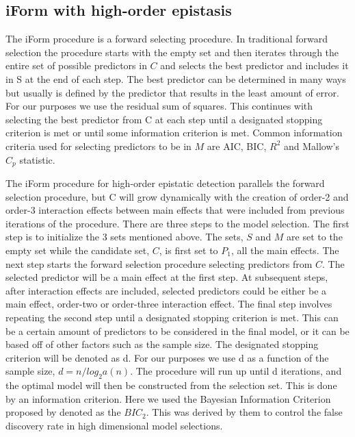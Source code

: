 \documentclass[11pt,]{book}
\theoremstyle{definition}
\theoremstyle{definition}
\theoremstyle{remark}
\begin{document}
\subsection{iForm with high-order
epistasis}\label{iform-with-high-order-epistasis}

The iForm procedure is a forward selecting procedure. In traditional
forward selection the procedure starts with the empty set and then
iterates through the entire set of possible predictors in \(C\) and
selects the best predictor and includes it in S at the end of each step.
The best predictor can be determined in many ways but usually is defined
by the predictor that results in the least amount of error. For our
purposes we use the residual sum of squares. This continues with
selecting the best predictor from C at each step until a designated
stopping criterion is met or until some information criterion is met.
Common information criteria used for selecting predictors to be in \(M\)
are AIC, BIC, \(R^2\) and Mallow's \(C_p\) statistic.

The iForm procedure for high-order epistatic detection parallels the
forward selection procedure, but C will grow dynamically with the
creation of order-2 and order-3 interaction effects between main effects
that were included from previous iterations of the procedure. There are
three steps to the model selection. The first step is to initialize the
3 sets mentioned above. The sets, \(S\) and \(M\) are set to the empty
set while the candidate set, \(C\), is first set to \(P_1\), all the
main effects. The next step starts the forward selection procedure
selecting predictors from \(C\). The selected predictor will be a main
effect at the first step. At subsequent steps, after interaction effects
are included, selected predictors could be either be a main effect,
order-two or order-three interaction effect. The final step involves
repeating the second step until a designated stopping criterion is met.
This can be a certain amount of predictors to be considered in the final
model, or it can be based off of other factors such as the sample size.
The designated stopping criterion will be denoted as d. For our purposes
we use d as a function of the sample size, \(d = n/lo g_2a(n)\). The
procedure will run up until d iterations, and the optimal model will
then be constructed from the selection set. This is done by an
information criterion. Here we used the Bayesian Information Criterion
proposed by \cite{chen2008extended} denoted as the \(BIC_2\). This was
derived by them to control the false discovery rate in high dimensional
model selections.
\end{document}

